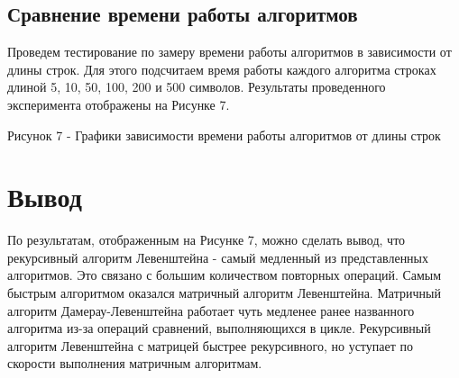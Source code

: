 \documentclass[12pt]{report}
\begin{document}
\subsection{Сравнение  времени работы алгоритмов}
Проведем тестирование по замеру времени работы алгоритмов в зависимости от длины строк. Для этого подсчитаем время работы каждого алгоритма строках длиной 5, 10, 50, 100, 200 и 500 символов. Результаты проведенного эксперимента отображены на Рисунке 7.

{}

Рисунок 7 - Графики зависимости времени работы алгоритмов от длины строк
\newline\newline

\section*{Вывод}
По результатам, отображенным на Рисунке 7, можно сделать вывод, что рекурсивный алгоритм Левенштейна - самый медленный из представленных алгоритмов. Это связано с большим количеством повторных операций. Самым быстрым алгоритмом оказался  матричный алгоритм Левенштейна. Матричный алгоритм Дамерау-Левенштейна работает чуть медленее ранее названного алгоритма из-за операций сравнений, выполняющихся в цикле. Рекурсивный алгоритм Левенштейна с матрицей быстрее рекурсивного, но уступает по скорости выполнения матричным алгоритмам. 
\end{document}
